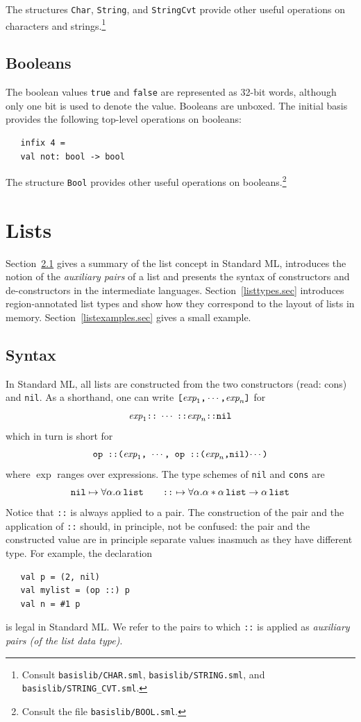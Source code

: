 \documentclass[12pt]{book}
\begin{document}
The structures {\tt Char}, {\tt String}, and {\tt StringCvt} provide other
useful operations on characters and strings.\footnote{Consult {\tt basislib/CHAR.sml}, {\tt basislib/STRING.sml},
  and {\tt basislib/STRING\_CVT.sml}.}

\section{Booleans}
The boolean values {\tt true} and {\tt false} are represented as
32-bit words, although only one bit is used to denote the value.
Booleans are unboxed. The 
%
initial basis provides the following top-level operations on
booleans:
%
%
\begin{verbatim}
   infix 4 =
   val not: bool -> bool
\end{verbatim}
The structure {\tt Bool} provides other useful operations on
booleans.\footnote{Consult the file {\tt basislib/BOOL.sml}.}

\chapter{Lists}
\label{lists.sec}
Section~\ref{lsyn.sec} gives a summary of the list concept in Standard
ML, introduces the notion of the {\em auxiliary pairs} of a list and
presents the syntax of constructors and de-constructors in the
intermediate languages.  Section~\ref{listtypes.sec} introduces
region-annotated list types and show how they correspond to the layout
of lists in memory.  Section~\ref{listexamples.sec} gives a small
example.

\section{Syntax}
\label{lsyn.sec}
In Standard ML, all lists are constructed 
from the two constructors 
%
\boxml{::} (read: cons) and 
%
{\tt nil}.  As a shorthand, one can write
$\hbox{\tt [}\hbox{\it exp}_1\hbox{\tt ,}\cdots \hbox{\tt ,}\hbox{\it exp}_n\hbox{\tt ]}$ for
$$ \hbox{\it exp}_1\hbox{\tt ::}\; \cdots\; \hbox{\tt ::} \hbox{\it exp}_n\hbox{\tt ::}\hbox{\tt nil}$$
which in turn is short for
$$
\hbox{\tt op ::($\hbox{\it exp}_1$, $\cdots$, op ::($\hbox{\it exp}_n$,nil)$\cdots$)}$$
where $\exp$ ranges over expressions.  The type schemes of {\tt nil}
and {\tt cons} are
$$\hbox{\tt nil}\mapsto\forall\alpha.\alpha\,\hbox{\tt list}\qquad
\hbox{\tt ::} \mapsto\forall\alpha.\alpha\ast\alpha\,\hbox{\tt list}\to\alpha\,\hbox{\tt list}
$$
Notice that {\tt ::} is always applied to a pair. The construction
of the pair and the application of {\tt ::} should, in principle, not
be confused: the pair and the constructed value are in principle
separate values inasmuch as they have different type.  For example,
the declaration
\begin{verbatim}
   val p = (2, nil)
   val mylist = (op ::) p
   val n = #1 p
\end{verbatim}
is legal in Standard ML. We refer to the pairs to which {\tt ::} is
applied as 
%
{\em auxiliary pairs (of the list data type)}.
\end{document}
